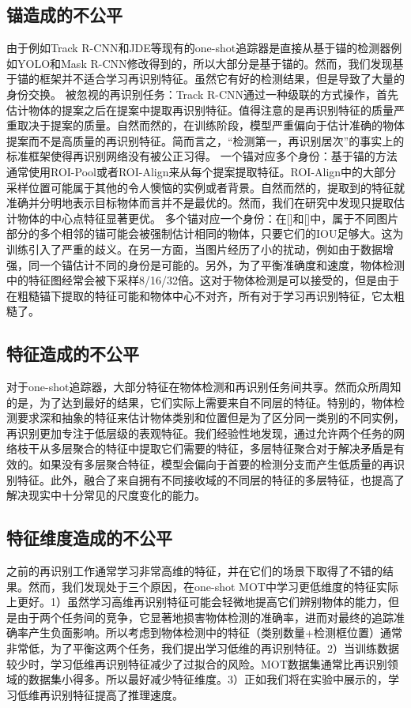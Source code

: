 \documentclass{ctexart}
\begin{document}
\subsection{锚造成的不公平}
由于例如Track R-CNN和JDE等现有的one-shot追踪器是直接从基于锚的检测器例如YOLO和Mask R-CNN修改得到的，所以大部分是基于锚的。然而，我们发现基于锚的框架并不适合学习再识别特征。虽然它有好的检测结果，但是导致了大量的身份交换。\newline
被忽视的再识别任务：Track R-CNN通过一种级联的方式操作，首先估计物体的提案之后在提案中提取再识别特征。值得注意的是再识别特征的质量严重取决于提案的质量。自然而然的，在训练阶段，模型严重偏向于估计准确的物体提案而不是高质量的再识别特征。简而言之，“检测第一，再识别居次”的事实上的标准框架使得再识别网络没有被公正习得。\newline
一个锚对应多个身份：基于锚的方法通常使用ROI-Pool或者ROI-Align来从每个提案提取特征。ROI-Align中的大部分采样位置可能属于其他的令人懊恼的实例或者背景。自然而然的，提取到的特征就准确并分明地表示目标物体而言并不是最优的。然而，我们在研究中发现只提取估计物体的中心点特征显著更优。\newline
多个锚对应一个身份：在[]和[]中，属于不同图片部分的多个相邻的锚可能会被强制估计相同的物体，只要它们的IOU足够大。这为训练引入了严重的歧义。在另一方面，当图片经历了小的扰动，例如由于数据增强，同一个锚估计不同的身份是可能的。另外，为了平衡准确度和速度，物体检测中的特征图经常会被下采样8/16/32倍。这对于物体检测是可以接受的，但是由于在粗糙锚下提取的特征可能和物体中心不对齐，所有对于学习再识别特征，它太粗糙了。
\subsection{特征造成的不公平}
对于one-shot追踪器，大部分特征在物体检测和再识别任务间共享。然而众所周知的是，为了达到最好的结果，它们实际上需要来自不同层的特征。特别的，物体检测要求深和抽象的特征来估计物体类别和位置但是为了区分同一类别的不同实例，再识别更加专注于低层级的表观特征。我们经验性地发现，通过允许两个任务的网络枝干从多层聚合的特征中提取它们需要的特征，多层特征聚合对于解决矛盾是有效的。如果没有多层聚合特征，模型会偏向于首要的检测分支而产生低质量的再识别特征。此外，融合了来自拥有不同接收域的不同层的特征的多层特征，也提高了解决现实中十分常见的尺度变化的能力。
\subsection{特征维度造成的不公平}
之前的再识别工作通常学习非常高维的特征，并在它们的场景下取得了不错的结果。然而，我们发现处于三个原因，在one-shot MOT中学习更低维度的特征实际上更好。1）虽然学习高维再识别特征可能会轻微地提高它们辨别物体的能力，但是由于两个任务间的竞争，它显著地损害物体检测的准确率，进而对最终的追踪准确率产生负面影响。所以考虑到物体检测中的特征（类别数量+检测框位置）通常非常低，为了平衡这两个任务，我们提出学习低维的再识别特征。2）当训练数据较少时，学习低维再识别特征减少了过拟合的风险。MOT数据集通常比再识别领域的数据集小得多。所以最好减少特征维度。3）正如我们将在实验中展示的，学习低维再识别特征提高了推理速度。
\end{document}
